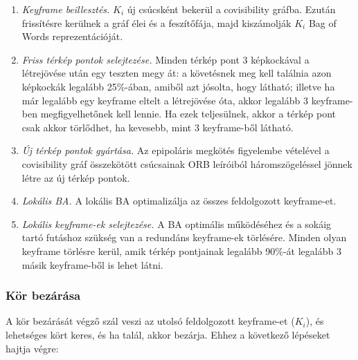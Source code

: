 \begin{enumerate}
	\item \textit{Keyframe beillesztés.} $K_i$ új csúcsként bekerül a covisibility gráfba. Ezután frissítésre kerülnek a gráf élei és a feszítőfája, majd kiszámolják $K_i$ Bag of Words reprezentációját.
	\item \textit{Friss térkép pontok selejtezése.} Minden térkép pont 3 képkockával a létrejövése után egy teszten megy át: a követésnek meg kell találnia azon képkockák legalább 25\%-ában, amiből azt jósolta, hogy látható; illetve ha már legalább egy keyframe eltelt a létrejövése óta, akkor legalább 3 keyframe-ben megfigyelhetőnek kell lennie. Ha ezek teljesülnek, akkor a térkép pont csak akkor törlődhet, ha kevesebb, mint 3 keyframe-ből látható.
	\item \textit{Új térkép pontok gyártása.} Az epipoláris megkötés figyelembe vételével a covisibility gráf összekötött csúcsainak ORB leíróiból háromszögeléssel jönnek létre az új térkép pontok.
	\item \textit{Lokális BA.} A lokális BA optimalizálja az összes feldolgozott keyframe-et.
	\item \textit{Lokális keyframe-ek selejtezése.} A BA optimális működéséhez és a sokáig tartó futáshoz szükség van a redundáns keyframe-ek törlésére. Minden olyan keyframe törlésre kerül, amik térkép pontjainak legalább 90\%-át legalább 3 másik keyframe-ből is lehet látni.
\end{enumerate}

\subsubsection{Kör bezárása}

A kör bezárását végző szál veszi az utolsó feldolgozott keyframe-et ($K_i$), és lehetséges kört keres, és ha talál, akkor bezárja.
Ehhez a következő lépéseket hajtja végre:

